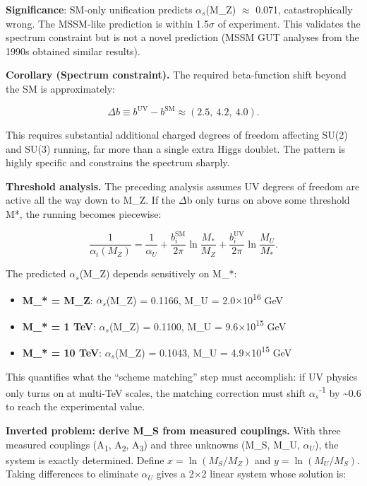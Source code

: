 \documentclass[11pt,a4paper]{article}
\theoremstyle{remark}
\providecommand{\tightlist}{%
  \setlength{\itemsep}{0pt}\setlength{\parskip}{0pt}}
\begin{document}
\textbf{Significance}: SM-only unification predicts \(\alpha_s\)(M\_Z) \ensuremath{\approx} 0.071,
catastrophically wrong. The MSSM-like prediction is within 1.5\ensuremath{\sigma} of
experiment. This validates the spectrum constraint but is not a novel
prediction (MSSM GUT analyses from the 1990s obtained similar results).

\textbf{Corollary (Spectrum constraint).} The required beta-function shift beyond
the SM is approximately:

\[
\Delta b \equiv b^{\mathrm{UV}} - b^{\mathrm{SM}} \approx (2.5,\ 4.2,\ 4.0).
\]

This requires substantial additional charged degrees of freedom affecting
SU(2) and SU(3) running, far more than a single extra Higgs doublet.
The pattern is highly specific and constrains the spectrum sharply.

\textbf{Threshold analysis.} The preceding analysis assumes UV degrees of freedom
are active all the way down to M\_Z. If the \ensuremath{\Delta}b only turns on above
some threshold M*, the running becomes piecewise:

\[
\frac{1}{\alpha_i(M_Z)} = \frac{1}{\alpha_U} + \frac{b_i^\mathrm{SM}}{2\pi}
\ln\frac{M_\ast}{M_Z} + \frac{b_i^\mathrm{UV}}{2\pi}\ln\frac{M_U}{M_\ast}.
\]

The predicted \(\alpha_s\)(M\_Z) depends sensitively on M\_*:

\begin{itemize}
\tightlist
\item
  \textbf{M\_* = M\_Z}: \(\alpha_s\)(M\_Z) = 0.1166, M\_U = 2.0\ensuremath{\times}10\textsuperscript{16} GeV
\item
  \textbf{M\_* = 1 TeV}: \(\alpha_s\)(M\_Z) = 0.1100, M\_U = 9.6\ensuremath{\times}10\textsuperscript{15} GeV
\item
  \textbf{M\_* = 10 TeV}: \(\alpha_s\)(M\_Z) = 0.1043, M\_U = 4.9\ensuremath{\times}10\textsuperscript{15} GeV
\end{itemize}

This quantifies what the ``scheme matching'' step must accomplish: if UV physics
only turns on at multi-TeV scales, the matching correction must shift
\(\alpha_s\)\textsuperscript{-1} by \textasciitilde0.6 to reach the experimental value.

\textbf{Inverted problem: derive M\_S from measured couplings.} With three measured
couplings (A\textsubscript{1}, A\textsubscript{2}, A\textsubscript{3}) and three unknowns (M\_S, M\_U, \(\alpha_U\)), the
system is exactly determined. Define \(x = \ln(M_S/M_Z)\) and
\(y = \ln(M_U/M_S)\). Taking differences to eliminate \(\alpha_U\) gives a 2\ensuremath{\times}2
linear system whose solution is:
\end{document}
